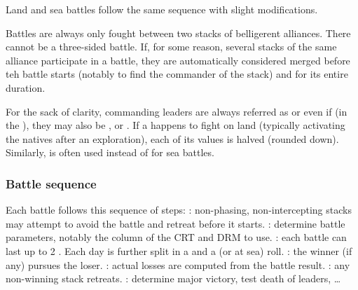 Land and sea battles follow the same sequence with slight modifications.

Battles are always only fought between two stacks of belligerent
alliances. There cannot be a three-sided battle. If, for some reason, several
stacks of the same alliance participate in a battle, they are automatically
considered merged before teh battle starts (notably to find the commander of
the stack) and for its entire duration.


For the sack of clarity, commanding leaders are always referred as \LeaderG or
\LeaderA even if (in the \ROTW), they may also be \LeaderC, \LeaderGov or
\LeaderE. If a \LeaderE happens to fight on land (typically activating the
natives after an exploration), each of its values is halved (rounded
down). Similarly,  is often used instead of  for
sea battles.

\subsubsection{Battle sequence}
\aparag Each battle follows this sequence of steps:
\bparag {}: non-phasing, non-intercepting
stacks may attempt to avoid the battle and retreat before it starts.
\bparag {}: determine battle parameters,
notably the column of the CRT and DRM to use.
\bparag {}: each battle can last up to 2
. Each day is further split in a  and a 
(or  at sea) roll.
\bparag {}: the winner (if any) pursues the
loser.
\bparag {}: actual losses are
computed from the battle result.
\bparag {}: any non-winning stack retreats.
\bparag {}: determine major victory, test
death of leaders, \ldots


